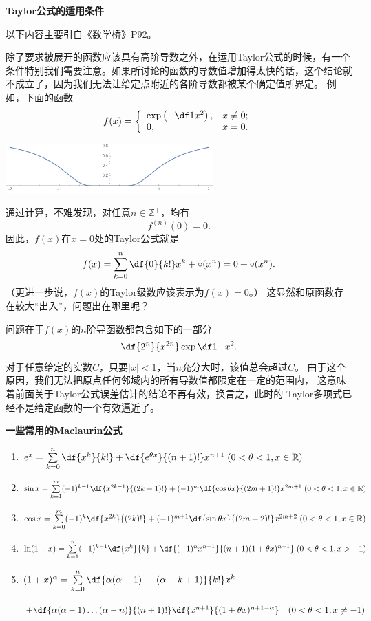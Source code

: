 \begin{shaded}
	{\bf Taylor公式的适用条件}
	
	以下内容主要引自《数学桥》P92。
	
	除了要求被展开的函数应该具有高阶导数之外，在运用Taylor公式的时候，有一个
	条件特别我们需要注意。如果所讨论的函数的导数值增加得太快的话，这个结论就
	不成立了，因为我们无法让给定点附近的各阶导数都被某个确定值所界定。
	例如，下面的函数
	$$f(x)=\left\{\begin{array}{ll}
		\exp\left(-\df1{x^2}\right),&x\ne 0;\\
		0,& x=0.
	\end{array}\right.$$
	\begin{center}
		\includegraphics[width=0.6\textwidth]{./images/ch3/e-1x2.pdf}
	\end{center}
	通过计算，不难发现，对任意$n\in\mathbb{Z}^+$，均有
	$$f^{(n)}(0)=0.$$
	因此，$f(x)$在$x=0$处的Taylor公式就是
	$$f(x)=\sum\limits_{k=0}^n\df{0}{k!}x^k+\circ(x^n)
	=0+\circ(x^n).$$
	（更进一步说，$f(x)$的Taylor级数应该表示为$f(x)=0$。）
	这显然和原函数存在较大“出入”，问题出在哪里呢？
	
	问题在于$f(x)$的$n$阶导函数都包含如下的一部分
	$$\df{2^n}{x^{2n}}\exp\df1{-x^2}.$$
	对于任意给定的实数$C$，只要$|x|<1$，当$n$充分大时，该值总会超过$C$。
	由于这个原因，我们无法把原点任何邻域内的所有导数值都限定在一定的范围内，
	这意味着前面关于Taylor公式误差估计的结论不再有效，换言之，此时的
	Taylor多项式已经不是给定函数的一个有效逼近了。
\end{shaded}

\begin{thx}
	{\bf 一些常用的Maclaurin公式}
	\begin{enumerate}[(1)]
	  \item $e^x =\sum\limits_{k=0}^n\df{x^k}{k!}
	  +\df{e^{\theta x}}{(n+1)!}x^{n+1}\;
	  (0<\theta<1,x\in\mathbb{R})$
	  \item $\sin x
	  =\sum\limits_{k=1}^m(-1)^{k-1}\df{x^{2k-1}}{(2k-1)!} 
	  +(-1)^m\df{\cos\theta x}{(2m+1)!}x^{2m+1}\;
	  (0<\theta<1,x\in\mathbb{R})$
	  \item $\cos x= \sum\limits_{k=0}^m(-1)^{k}\df{x^{2k}}{(2k)!}
	  +(-1)^{m+1}\df{\sin\theta
	  x}{(2m+2)!}x^{2m+2}\; (0<\theta<1,x\in\mathbb{R})$
	  \item
	  $\ln(1+x) =\sum\limits_{k=1}^n(-1)^{k-1}\df{x^k}{k}
	  +\df{(-1)^nx^{n+1}}{(n+1)(1+\theta
	  x)^{n+1}}\; (0<\theta<1,x>-1)$
	  \item
	  $(1+x)^\alpha =\sum\limits_{k=0}^n
	  \df{\alpha(\alpha-1)\ldots(\alpha-k+1)}{k!}x^k$

		\hspace{2cm}$+\df{\alpha(\alpha-1)\ldots(\alpha-n)}{(n+1)!}\df{x^{n+1}}{(1+\theta
		x)^{n+1-\alpha}}\quad (0<\theta<1,x\ne -1)$
	\end{enumerate}
\end{thx}

